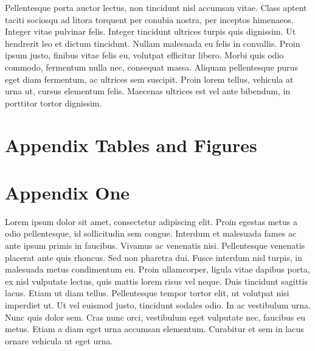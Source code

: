 \documentclass[12pt]{article}
\begin{document}
Pellentesque porta auctor lectus, non tincidunt nisl accumsan vitae. Class aptent taciti sociosqu ad litora torquent per conubia nostra, per inceptos himenaeos. Integer vitae pulvinar felis. Integer tincidunt ultrices turpis quis dignissim. Ut hendrerit leo et dictum tincidunt. Nullam malesuada eu felis in convallis. Proin ipsum justo, finibus vitae felis eu, volutpat efficitur libero. Morbi quis odio commodo, fermentum nulla nec, consequat massa. Aliquam pellentesque purus eget diam fermentum, ac ultrices sem suscipit. Proin lorem tellus, vehicula at urna ut, cursus elementum felis. Maecenas ultrices est vel ante bibendum, in porttitor tortor dignissim.




\clearpage
\begin{singlespace}
%
%


\end{singlespace}


\newpage
\appendix
\setcounter{table}{0}
\renewcommand{\tablename}{Appendix Table}
\renewcommand{\figurename}{Appendix Figure}
\renewcommand{\thetable}{A\arabic{table}}
\setcounter{figure}{0}
\renewcommand{\thefigure}{A\arabic{figure}}

\section{Appendix Tables and Figures}


\newpage 
\section{Appendix One \label{sec:appendix:first}}
\renewcommand{\thetable}{B\arabic{table}}
\setcounter{table}{0}
\renewcommand{\thefigure}{B\arabic{figure}}
\setcounter{figure}{0}

Lorem ipsum dolor sit amet, consectetur adipiscing elit. Proin egestas metus a odio pellentesque, id sollicitudin sem congue. Interdum et malesuada fames ac ante ipsum primis in faucibus. Vivamus ac venenatis nisi. Pellentesque venenatis placerat ante quis rhoncus. Sed non pharetra dui. Fusce interdum nisl turpis, in malesuada metus condimentum eu. Proin ullamcorper, ligula vitae dapibus porta, ex nisl vulputate lectus, quis mattis lorem risus vel neque. Duis tincidunt sagittis lacus. Etiam ut diam tellus. Pellentesque tempor tortor elit, ut volutpat nisi imperdiet ut. Ut vel euismod justo, tincidunt sodales odio. In ac vestibulum urna. Nunc quis dolor sem. Cras nunc orci, vestibulum eget vulputate nec, faucibus eu metus. Etiam a diam eget urna accumsan elementum. Curabitur et sem in lacus ornare vehicula ut eget urna.
\end{document}
